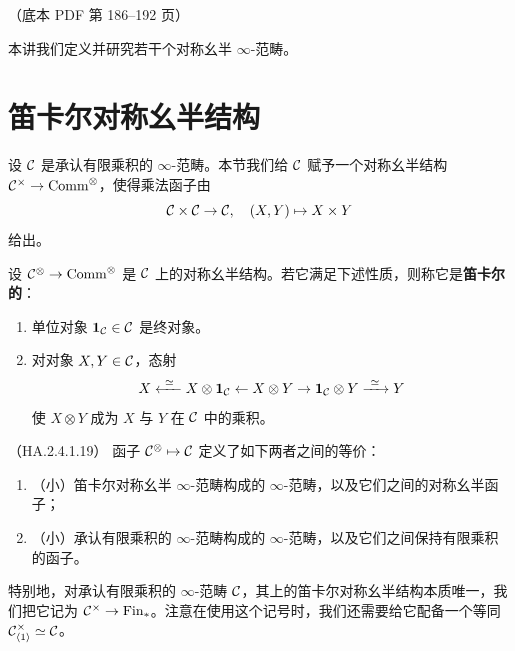 \begin{center}\small\color{black!55}（底本 PDF 第 186–192 页）\end{center}

本讲我们定义并研究若干个对称幺半 $\infty$-范畴。

\section{笛卡尔对称幺半结构}

\nitem\label{L25-1.1} 设 $\mathcal{C}$ 是承认有限乘积的 $\infty$-范畴。本节我们给 $\mathcal{C}$ 赋予一个对称幺半结构 $\mathcal{C}^{\times}\to\mathrm{Comm}^{\otimes}$，使得乘法函子由
\[
\mathcal{C}\times\mathcal{C}\to\mathcal{C},\quad (X,Y)\mapsto X\times Y
\]
给出。

\begin{definition}\label{L25-1.2}
设 $\mathcal{C}^{\otimes}\to\mathrm{Comm}^{\otimes}$ 是 $\mathcal{C}$ 上的对称幺半结构。若它满足下述性质，则称它是\textbf{笛卡尔的}：
\begin{enumerate}[label=(\arabic*),leftmargin=2.4em,itemsep=0.1em]
\item 单位对象 $\mathbf{1}_{\mathcal{C}}\in\mathcal{C}$ 是终对象。
\item 对对象 $X,Y\in\mathcal{C}$，态射
\[
X\xleftarrow{\ \simeq\ }X\otimes\mathbf{1}_{\cC}\leftarrow X\otimes Y\to\mathbf{1}_{\cC}\otimes Y\xrightarrow{\ \simeq\ }Y
\]
使 $X\otimes Y$ 成为 $X$ 与 $Y$ 在 $\mathcal{C}$ 中的乘积。
\end{enumerate}
\end{definition}

\begin{theorem}\label{L25-1.3}（HA.2.4.1.19）
函子 $\mathcal{C}^{\otimes}\mapsto\mathcal{C}$ 定义了如下两者之间的等价：
\begin{enumerate}[label=(\roman*),leftmargin=2.4em,itemsep=0.1em]
\item （小）笛卡尔对称幺半 $\infty$-范畴构成的 $\infty$-范畴，以及它们之间的对称幺半函子；
\item （小）承认有限乘积的 $\infty$-范畴构成的 $\infty$-范畴，以及它们之间保持有限乘积的函子。
\end{enumerate}
\end{theorem}

\nitem\label{L25-1.4} 特别地，对承认有限乘积的 $\infty$-范畴 $\mathcal{C}$，其上的笛卡尔对称幺半结构本质唯一，我们把它记为 $\mathcal{C}^{\times}\to\mathrm{Fin}_{*}$。注意在使用这个记号时，我们还需要给它配备一个等同 $\mathcal{C}^{\times}_{\langle1\rangle}\simeq\mathcal{C}$。

